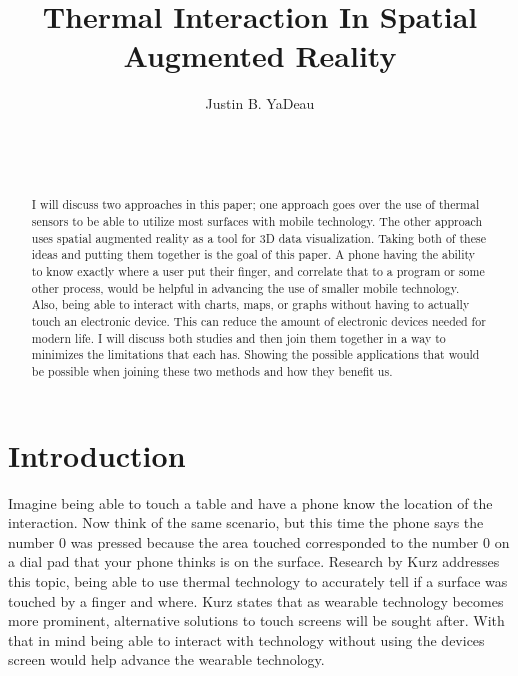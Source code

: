 \documentclass{sig-alternate}
\begin{document}

\title{Thermal Interaction In Spatial Augmented Reality}


\author{
\alignauthor
Justin B. YaDeau\\
	\\
	\\
	\\
}

\maketitle

\begin{abstract}
I will discuss two approaches in this paper; one approach goes over the use of thermal sensors to be able to utilize most surfaces with mobile technology. The other approach uses spatial augmented reality as a tool for 3D data visualization. Taking both of these ideas and putting them together is the goal of this paper. A phone having the ability to know exactly where a user put their finger, and correlate that to a program or some other process, would be helpful in advancing the use of smaller mobile technology. Also, being able to interact with charts, maps, or graphs without having to actually touch an electronic device. This can reduce the amount of electronic devices needed for modern life. I will discuss both studies and then join them together in a way to minimizes the limitations that each has. Showing the possible applications that would be possible when joining these two methods and how they benefit us.

\end{abstract}


\section{Introduction}
\label{sec:Introduction}
Imagine being able to touch a table and have a phone know the location of the interaction. Now think of the same scenario, but this time the phone says the number 0 was pressed because the area touched corresponded to the number 0 on a dial pad that your phone thinks is on the surface. Research by Kurz \cite{Thermal} addresses this topic, being able to use thermal technology to accurately tell if a surface was touched by a finger and where. Kurz \cite{Thermal} states that as wearable technology becomes more prominent, alternative solutions to touch screens will be sought after. With that in mind being able to interact with technology without using the devices screen would help advance the wearable technology.    
\end{document}
